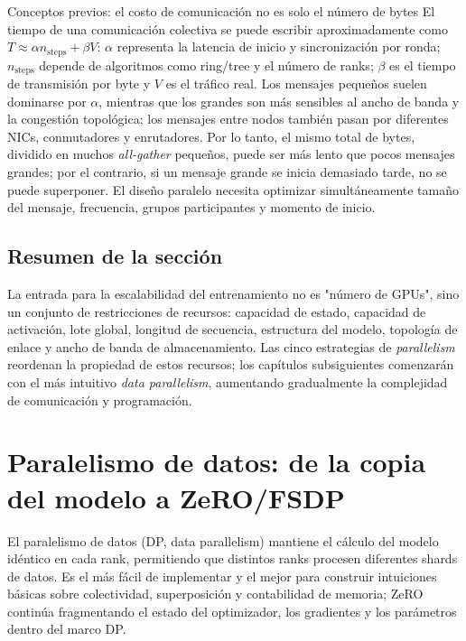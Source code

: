 \documentclass[a4paper]{article}
\begin{document}
\begin{knowledgebox}{Conceptos previos: el costo de comunicación no es solo el número de bytes}
El tiempo de una comunicación colectiva se puede escribir aproximadamente como $T\approx \alpha n_{\mathrm{steps}}+\beta V$: $\alpha$ representa la latencia de inicio y sincronización por ronda; $n_{\mathrm{steps}}$ depende de algoritmos como ring/tree y el número de ranks; $\beta$ es el tiempo de transmisión por byte y $V$ es el tráfico real. Los mensajes pequeños suelen dominarse por $\alpha$, mientras que los grandes son más sensibles al ancho de banda y la congestión topológica; los mensajes entre nodos también pasan por diferentes NICs, conmutadores y enrutadores. Por lo tanto, el mismo total de bytes, dividido en muchos \textit{all-gather} pequeños, puede ser más lento que pocos mensajes grandes; por el contrario, si un mensaje grande se inicia demasiado tarde, no se puede superponer. El diseño paralelo necesita optimizar simultáneamente tamaño del mensaje, frecuencia, grupos participantes y momento de inicio.
\end{knowledgebox}

\subsection{Resumen de la sección}

La entrada para la escalabilidad del entrenamiento no es "número de GPUs", sino un conjunto de restricciones de recursos: capacidad de estado, capacidad de activación, lote global, longitud de secuencia, estructura del modelo, topología de enlace y ancho de banda de almacenamiento. Las cinco estrategias de \textit{parallelism} reordenan la propiedad de estos recursos; los capítulos subsiguientes comenzarán con el más intuitivo \textit{data parallelism}, aumentando gradualmente la complejidad de comunicación y programación.


\section{Paralelismo de datos: de la copia del modelo a ZeRO/FSDP}

El paralelismo de datos (DP, data parallelism) mantiene el cálculo del modelo idéntico en cada rank, permitiendo que distintos ranks procesen diferentes shards de datos. Es el más fácil de implementar y el mejor para construir intuiciones básicas sobre colectividad, superposición y contabilidad de memoria; ZeRO continúa fragmentando el estado del optimizador, los gradientes y los parámetros dentro del marco DP.
\end{document}
